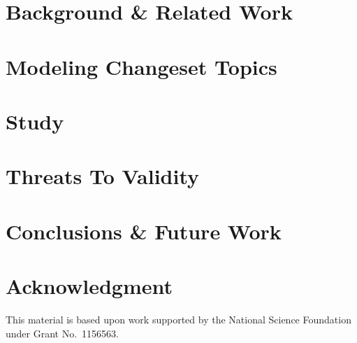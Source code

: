 \documentclass[conference]{IEEEtran}
\begin{document}
\section{Background \& Related Work}
\label{sec:related}


\section{Modeling Changeset Topics}
\label{sec:changeset}


\section{Study}
\label{sec:study}


\section{Threats To Validity}
\label{sec:threats}


\section{Conclusions \& Future Work}
\label{sec:conclusion}


\section*{Acknowledgment}
This material is based upon work supported
by the National Science Foundation under Grant No.\ 1156563. %

\newpage


\end{document}
